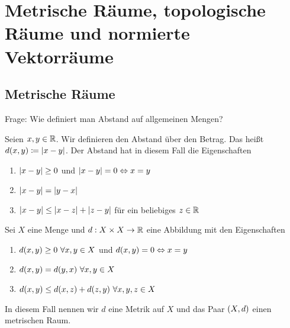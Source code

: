 \section{Metrische Räume, topologische Räume und normierte Vektorräume}

\subsection{Metrische Räume}
\thispagestyle{pagenumberonly}

\marginnote{[07. Jun]}
Frage: Wie definiert man Abstand auf allgemeinen Mengen?

\begin{beispiel}
    Seien $x,y\in\mathbb{R}$. Wir definieren den Abstand über den Betrag. Das heißt $d\of{x,y}\coloneqq \abs{x-y}$.
    Der Abstand hat in diesem Fall die Eigenschaften
    \begin{enumerate}[label=(\roman*)]
        \item $\left\lvert x-y\right\rvert \geq 0$ und $\left\lvert x-y\right\rvert = 0 \Leftrightarrow{} x=y$
        \item $\left\lvert x-y\right\rvert = \left\lvert y-x\right\rvert$
        \item $\left\lvert x-y\right\rvert \leq \left\lvert x-z\right\rvert + \left\lvert z-y\right\rvert$ für ein beliebiges $z\in\mathbb{R}$
    \end{enumerate}
\end{beispiel}

\begin{definition}[Metrik]
    Sei $X$ eine Menge und $d: X \times X\rightarrow{} \mathbb{R}$ eine Abbildung mit den Eigenschaften
    \begin{enumerate}[label=(\roman*)]
        \item $d\of{x,y} \geq 0~\forall x,y\in X$ und $d\of{x,y} = 0\equivalent x = y$
        \item $d\of{x,y} = d\of{y,x}~\forall x,y\in X$
        \item $d\of{x,y} \leq d\of{x,z} + d\of{z,y}~\forall x,y,z\in X$
    \end{enumerate}
    In diesem Fall nennen wir $d$ eine Metrik auf $X$ und das Paar $\left(X, d\right)$ einen metrischen Raum.
\end{definition}

